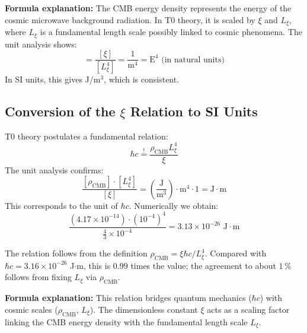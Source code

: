 	\textbf{Formula explanation:} The CMB energy density represents the energy of the cosmic microwave background radiation. In T0 theory, it is scaled by $\xi$ and $L_\xi$, where $L_\xi$ is a fundamental length scale possibly linked to cosmic phenomena. The unit analysis shows:
	\begin{equation}
		[\rho_{\text{CMB}}] = \frac{[\xi]}{[L_\xi^4]} = \frac{1}{\text{m}^4} = \text{E}^4 \text{ (in natural units)}
	\end{equation}
	In SI units, this gives J/m$^3$, which is consistent.
	
	\subsection{Conversion of the $\xi$ Relation to SI Units}
	T0 theory postulates a fundamental relation:
	\begin{equation}
		\hbar c \stackrel{!}{=} \frac{\rho_{\text{CMB}} L_\xi^4}{\xi}
	\end{equation}
	The unit analysis confirms:
	\begin{equation}
		\frac{[\rho_{\text{CMB}}] \cdot [L_\xi^4]}{[\xi]} = \left( \frac{\text{J}}{\text{m}^3} \right) \cdot \text{m}^4 \cdot 1 = \text{J} \cdot \text{m}
	\end{equation}
	This corresponds to the unit of $\hbar c$. Numerically we obtain:
	\begin{equation}
		\frac{\left( 4.17 \times 10^{-14} \right) \cdot \left( 10^{-4} \right)^4}{\frac{4}{3} \times 10^{-4}} = 3.13 \times 10^{-26} \text{ J} \cdot \text{m}
	\end{equation}
	
	The relation follows from the definition $\rho_{\text{CMB}} = \xi\hbar c/L_\xi^4$. Compared with $\hbar c = 3.16 \times 10^{-26}$ J$\cdot$m, this is $0.99$ times the value; the agreement to about $1\,\%$ follows from fixing $L_\xi$ via $\rho_{\text{CMB}}$.
	
	\textbf{Formula explanation:} This relation bridges quantum mechanics ($\hbar c$) with cosmic scales ($\rho_{\text{CMB}}$, $L_\xi$). The dimensionless constant $\xi$ acts as a scaling factor linking the CMB energy density with the fundamental length scale $L_\xi$.
	
